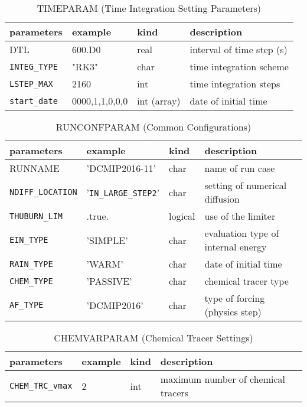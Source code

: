 \begin{table}[htb]
\begin{center}
\caption{TIMEPARAM (Time Integration Setting Parameters)}
\begin{tabularx}{150mm}{|l|l|l|X|} \hline
 \rowcolor[gray]{0.9} parameters & example & kind & description          \\ \hline
 DTL        & 600.D0 & real & interval of time step (s) \\ \hline
 \verb|INTEG_TYPE| & "RK3"  & char & time integration scheme \\ \hline
 \verb|LSTEP_MAX|  & 2160   & int  &  time integration steps \\ \hline
 \verb|start_date| & 0000,1,1,0,0,0 & int (array) & date of initial time \\ \hline
\end{tabularx}
\end{center}
\end{table}

\begin{table}[htb]
\begin{center}
\caption{RUNCONFPARAM (Common Configurations)}
\begin{tabularx}{150mm}{|l|l|l|X|} \hline
 \rowcolor[gray]{0.9} parameters & example & kind & description          \\ \hline
 RUNNAME               & 'DCMIP2016-11'   & char & name of run case \\ \hline
 \verb|NDIFF_LOCATION|        & '\verb|IN_LARGE_STEP2|' & char  & setting of numerical diffusion \\ \hline
 \verb|THUBURN_LIM|           & .true.      & logical & use of the limiter \\ \hline
 \verb|EIN_TYPE|              & 'SIMPLE'    & char  & evaluation type of internal energy \\ \hline
 \verb|RAIN_TYPE|             & 'WARM'      & char & date of initial time \\ \hline
 \verb|CHEM_TYPE|             & 'PASSIVE'   & char & chemical tracer type \\ \hline
 \verb|AF_TYPE|               & 'DCMIP2016' & char & type of forcing (physics step) \\ \hline
\end{tabularx}
\end{center}
\end{table}

\begin{table}[htb]
\begin{center}
\caption{CHEMVARPARAM (Chemical Tracer Settings)}
\begin{tabularx}{150mm}{|l|l|l|X|} \hline
 \rowcolor[gray]{0.9} parameters & example & kind & description          \\ \hline
 \verb|CHEM_TRC_vmax| & 2 & int &  maximum number of chemical tracers \\ \hline
\end{tabularx}
\end{center}
\end{table}

